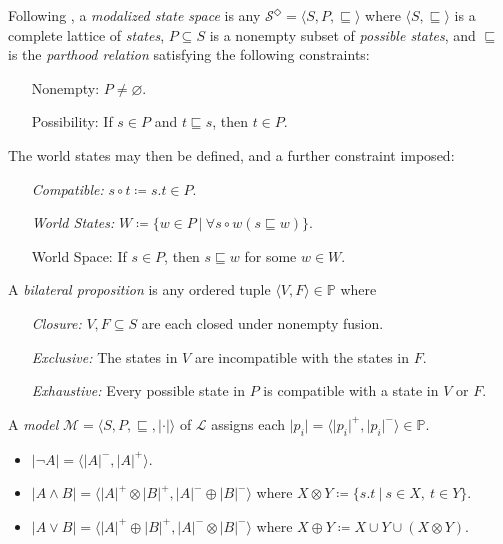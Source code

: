 \documentclass[a4paper, 11pt]{article} %
\theoremstyle{Pthm}
\newcommand{\tuple}[1]{\langle#1\rangle} %
\newcommand{\set}[1]{\lbrace#1\rbrace} %
\renewcommand{\vert}[1]{\lvert#1\rvert}
\begin{document}
Following \cite{Fine2017d,Fine2017,Fine2017a},  a \textit{modalized state space} is any $\mathcal{S}^\Diamond = \tuple{S,P,\sqsubseteq}$ where $\tuple{S,\sqsubseteq}$ is a complete lattice of \textit{states}, $P\subseteq S$ is a nonempty subset of \textit{possible states}, and $\sqsubseteq$ is the \textit{parthood relation} satisfying the following constraints:
  \begin{enumerate}[leftmargin=1.7in, itemsep=.05in]
    \item[\sc Nonempty:] $P \neq \varnothing$.
    \item[\sc Possibility:] If $s \in P$ and $t\sqsubseteq s$, then $t \in P$. 
  \end{enumerate}
The world states may then be defined, and a further constraint imposed:
  \begin{enumerate}[leftmargin=1.7in, itemsep=.05in]
    \item[\it Compatible:]  $s\circ t \coloneq s.t\in P$. 
    \item[\it World States:] $W \coloneq \set{w \in P\ |\ \forall s \circ w (s \sqsubseteq w)}$.
    \item[\sc World Space:] If $s \in P$, then $s \sqsubseteq w$ for some $w \in W$. 
  \end{enumerate}
A \textit{bilateral proposition} is any ordered tuple $\tuple{V,F} \in \mathbb{P}$ where
  \begin{enumerate}[leftmargin=1in, itemsep=.05in]
    \item[\it Closure:] $V, F \subseteq S$ are each closed under nonempty fusion.
    \item[\it Exclusive:] The states in $V$ are incompatible with the states in $F$.
    \item[\it Exhaustive:] Every possible state in $P$ is compatible with a state in $V$ or $F$.
  \end{enumerate}
A \textit{model} $\mathcal{M} = \tuple{S, P, \sqsubseteq, \vert{\cdot}}$ of $\mathcal{L}$ assigns each $\vert{p_i} = \tuple{\vert{p_i}^+, \vert{p_i}^-} \in \mathbb{P}$.
  \begin{itemize}[leftmargin=.25in, itemsep=.05in]
    \item $\vert{\neg A} = \tuple{\vert{A}^-, \vert{A}^+}$.
    \item $\vert{A\wedge B} = \tuple{\vert{A}^+ \otimes \vert{B}^+,  \vert{A}^- \oplus \vert{B}^-}$ where $X \otimes Y \coloneq \set{s.t \ |\ s \in X,\ t \in Y}$. 
    \item $\vert{A\vee B} = \tuple{\vert{A}^+ \oplus \vert{B}^+,  \vert{A}^- \otimes \vert{B}^-}$ where $X \oplus Y \coloneq X \cup Y \cup (X \otimes Y)$.
  \end{itemize}
\end{document}
